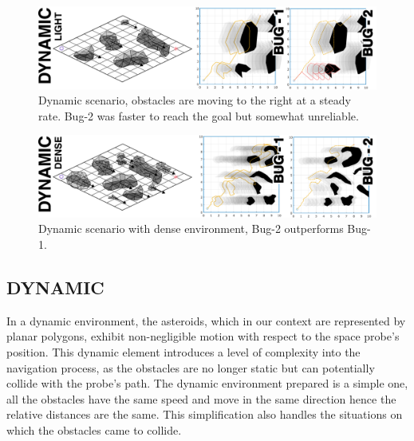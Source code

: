 \documentclass{IEEEtaes}
\begin{document}
\begin{figure}[t!]
    \begin{center}
        \includegraphics[width=1.0\linewidth]{figures/DYNAMIC-1.pdf}
     \end{center}
     \caption{Dynamic scenario, obstacles are moving to the right at a steady rate. Bug-2 was faster to reach the goal but somewhat unreliable.}
     \label{dynamic-1}
\end{figure}

\begin{figure}[t!]
    \begin{center}
        \includegraphics[width=1.0\linewidth]{figures/DYNAMIC-2.pdf}
     \end{center}
     \caption{Dynamic scenario with dense environment, Bug-2 outperforms Bug-1.}
     \label{dynamic-2}
     \vspace{-1em}
\end{figure}

\subsection{\fontsize{10}{13}\selectfont DYNAMIC}

In a dynamic environment, the asteroids, which in our context are represented by planar polygons, exhibit non-negligible motion with respect to the space probe's position. This dynamic element introduces a level of complexity into the navigation process, as the obstacles are no longer static but can potentially collide with the probe's path. The dynamic environment prepared is a simple one, all the obstacles have the same speed and move in the same direction hence the relative distances are the same. This simplification also handles the situations on which the obstacles came to collide.
\end{document}
